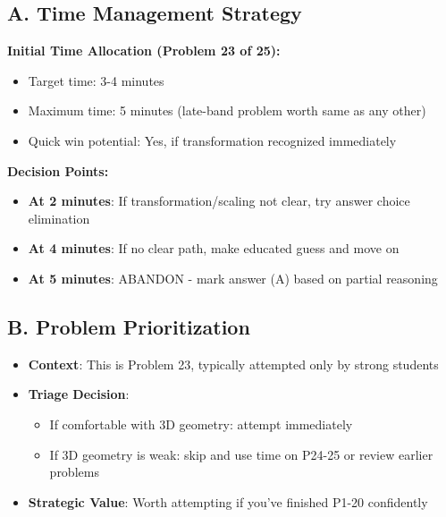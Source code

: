 \documentclass[11pt]{article}
\begin{document}
\begin{competitionbox}
\subsection*{A. Time Management Strategy}

\textbf{Initial Time Allocation (Problem 23 of 25):}
\begin{itemize}[leftmargin=*]
    \item Target time: 3-4 minutes
    \item Maximum time: 5 minutes (late-band problem worth same as any other)
    \item Quick win potential: Yes, if transformation recognized immediately
\end{itemize}

\textbf{Decision Points:}
\begin{itemize}[leftmargin=*]
    \item \textbf{At 2 minutes}: If transformation/scaling not clear, try answer choice elimination
    \item \textbf{At 4 minutes}: If no clear path, make educated guess and move on
    \item \textbf{At 5 minutes}: ABANDON - mark answer (A) based on partial reasoning
\end{itemize}

\subsection*{B. Problem Prioritization}
\begin{itemize}[leftmargin=*]
    \item \textbf{Context}: This is Problem 23, typically attempted only by strong students
    \item \textbf{Triage Decision}: 
    \begin{itemize}
        \item If comfortable with 3D geometry: attempt immediately
        \item If 3D geometry is weak: skip and use time on P24-25 or review earlier problems
    \end{itemize}
    \item \textbf{Strategic Value}: Worth attempting if you've finished P1-20 confidently
\end{itemize}


\end{competitionbox}
\end{document}
